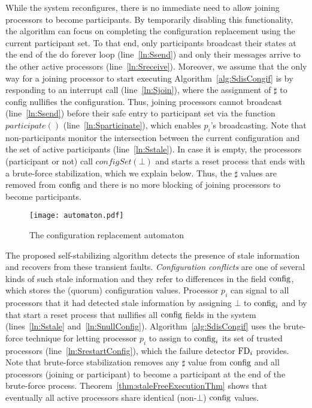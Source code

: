 \documentclass[11pt]{article}
\begin{document}
{
While the system reconfigures, there is no immediate need to allow joining processors to become participants. By temporarily disabling this functionality, the algorithm can focus on completing the configuration replacement using the current participant set. To that end, 
only participants broadcast their states at the end of the do forever loop (line~\ref{ln:Ssend}) and only their messages arrive to the other active processors (line~\ref{ln:Sreceive}). Moreover, we assume that the only way for a joining processor to start executing Algorithm~\ref{alg:SdisCongif} is by responding to an interrupt call (line~\ref{ln:Sjoin}), where  the assignment of $\sharp$ to \textnormal{config} nullifies the configuration. Thus, joining processors cannot broadcast (line~\ref{ln:Ssend}) before their safe entry to participant set via the function $participate()$ (line~\ref{ln:Sparticipate}), which enables $p_i$'s broadcasting. 
Note that non-participants monitor the intersection between the current configuration and the set of active participants (line~\ref{ln:Sstale}). In case it is empty, the processors (participant or not) call $configSet(\bot)$ and starts a reset process that ends with a brute-force stabilization, which we explain below. Thus, the $\sharp$ values are removed from $\textnormal{config}$ and there is no more blocking of joining processors to become participants.








\begin{figure*}[t!] 
\center
\texttt{[image: automaton.pdf]}
    \caption{The configuration replacement automaton}
    \label{fig:auto}
\end{figure*} 


The proposed self-stabilizing algorithm detects the presence of stale information and recovers from these transient faults. {\em Configuration conflicts} are one of several kinds of such stale information and they refer to differences in the field $\textnormal{config}$, which stores the (quorum) configuration values. Processor $p_i$ can signal to all processors that it had detected stale information by assigning $\bot$ to $\textnormal{config}_i$ and by that start a reset process that nullifies all $\textnormal{config}$ fields in the system (lines~\ref{ln:Sstale} and~\ref{ln:SnullConfig}). 
Algorithm~\ref{alg:SdisCongif} uses the brute-force technique for letting processor $p_i$ to assign to $\textnormal{config}_i$ its set of trusted processors (line~\ref{ln:SrestartConfig}), which the failure detector $\textnormal{FD}_i$ provides. Note that brute-force stabilization removes any $\sharp$ value from $\textnormal{config}$ and all processors (joining or participant) to become a participant at the end of the brute-force process. Theorem~\ref{thm:staleFreeExecutionThm} shows that eventually all active processors share identical (non-$\bot$) $\textnormal{config}$ values.




}
\end{document}
